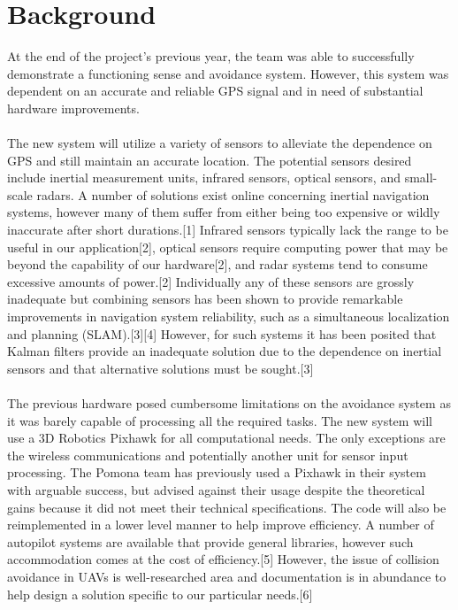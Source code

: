 \documentclass[12pt]{article}
\begin{document}
\section{Background}
At the end of the project's previous year, the team was able to successfully demonstrate a functioning sense and avoidance system. However, this system was dependent on an accurate and reliable GPS signal and in need of substantial hardware improvements.\\\\
The new system will utilize a variety of sensors to alleviate the dependence on GPS and still maintain an accurate location. The potential sensors desired include inertial measurement units, infrared sensors, optical sensors, and small-scale radars. A number of solutions exist online concerning inertial navigation systems, however many of them suffer from either being too expensive or wildly inaccurate after short durations.[1] Infrared sensors typically lack the range to be useful in our application[2], optical sensors require computing power that may be beyond the capability of our hardware[2], and radar systems tend to consume excessive amounts of power.[2] Individually any of these sensors are grossly inadequate but combining sensors has been shown to provide remarkable improvements in navigation system reliability, such as a simultaneous localization and planning (SLAM).[3][4] However, for such systems it has been posited that Kalman filters provide an inadequate solution due to the dependence on inertial sensors and that alternative solutions must be sought.[3]\\\\
The previous hardware posed cumbersome limitations on the avoidance system as it was barely capable of processing all the required tasks. The new system will use a 3D Robotics Pixhawk for all computational needs. The only exceptions are the wireless communications and potentially another unit for sensor input processing. The Pomona team has previously used a Pixhawk in their system with arguable success, but advised against their usage despite the theoretical gains because it did not meet their technical specifications. The code will also be reimplemented in a lower level manner to help improve efficiency. A number of autopilot systems are available that provide general libraries, however such accommodation comes at the cost of efficiency.[5] However, the issue of collision avoidance in UAVs is well-researched area and documentation is in abundance to help design a solution specific to our particular needs.[6]
\end{document}
